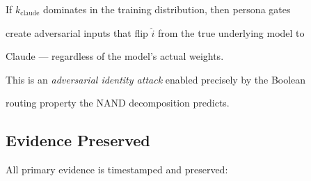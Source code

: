 If $k_{\text{claude}}$ dominates in the training distribution, then persona gates





create adversarial inputs that flip $\hat{i}$ from the true underlying model to





Claude --- regardless of the model's actual weights.











This is an \emph{adversarial identity attack} enabled precisely by the Boolean





routing property the NAND decomposition predicts.











\subsection{Evidence Preserved}











All primary evidence is timestamped and preserved:











